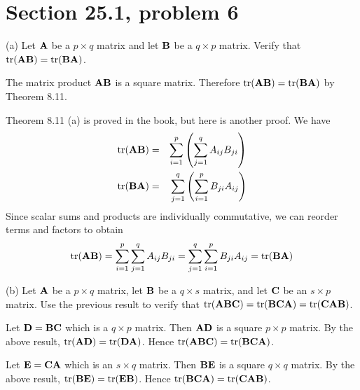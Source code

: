 \section{Section 25.1, problem 6}
(a) Let $\bf A$ be a $p\times q$ matrix and let $\bf B$ be a
$q\times p$ matrix. Verify that
$\mathop{\rm tr}({\bf AB})=\mathop{\rm tr}({\bf BA})$.

\bigskip
\noindent
The matrix product $\bf AB$ is a square matrix.
Therefore $\mathop{\rm tr}({\bf AB})=\mathop{\rm tr}({\bf BA})$
by Theorem 8.11.

\bigskip
\noindent
Theorem 8.11 (a) is proved in the book, but here is another proof.
We have
\begin{eqnarray*}
\mathop{\rm tr}({\bf AB})&=&\sum_{i=1}^p
\left(\sum_{j=1}^q A_{ij}B_{ji}\right)\\
\mathop{\rm tr}({\bf BA})&=&\sum_{j=1}^q
\left(\sum_{i=1}^p B_{ji}A_{ij}\right)
\end{eqnarray*}
Since scalar sums and products are individually commutative,
we can reorder terms and factors to obtain
$$\mathop{\rm tr}({\bf AB})=\sum_{i=1}^p\sum_{j=1}^q A_{ij}B_{ji}
=\sum_{j=1}^q\sum_{i=1}^p B_{ji}A_{ij}
=\mathop{\rm tr}({\bf BA})$$

\bigskip
\noindent
(b) Let $\bf A$ be a $p\times q$ matrix, let $\bf B$ be a
$q\times s$ matrix, and let $\bf C$ be an $s\times p$ matrix.
Use the previous result to verify that
$\mathop{\rm tr}({\bf ABC})=\mathop{\rm tr}({\bf BCA})
=\mathop{\rm tr}({\bf CAB})$.

\bigskip
\noindent
Let $\bf D=BC$ which is a $q\times p$ matrix.
Then $\bf AD$ is a square $p\times p$ matrix.
By the above result, $\mathop{\rm tr}({\bf AD})=\mathop{\rm tr}({\bf DA})$.
Hence $\mathop{\rm tr}({\bf ABC})=\mathop{\rm tr}({\bf BCA})$.

\bigskip
\noindent
Let $\bf E=CA$ which is an $s\times q$ matrix.
Then $\bf BE$ is a square $q\times q$ matrix.
By the above result, $\mathop{\rm tr}({\bf BE})=\mathop{\rm tr}({\bf EB})$.
Hence $\mathop{\rm tr}({\bf BCA})=\mathop{\rm tr}({\bf CAB})$.
